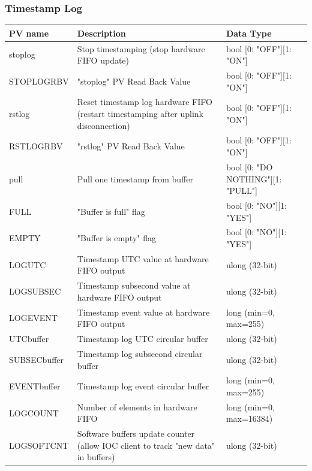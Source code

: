 \documentclass[openany]{article}
\begin{document}
		\subsubsection{Timestamp Log}\label{pvgroup:evre-timestamp-log}
			\begin{center}
			\begin{tabular}{| m{2.8cm} m{6cm} m{6cm} |}
			    \hline
			    \bfseries PV name & \bfseries Description & \bfseries Data Type \\ \hline
			    stoplog & Stop timestamping (stop hardware FIFO update) & bool [0: "OFF"][1: "ON"] \\ \hline
			    STOPLOGRBV & "stoplog" PV Read Back Value & bool [0: "OFF"][1: "ON"] \\ \hline
			    rstlog & Reset timestamp log hardware FIFO (restart timestamping after uplink disconnection) & bool [0: "OFF"][1: "ON"] \\ \hline
			    RSTLOGRBV & "rstlog" PV Read Back Value & bool [0: "OFF"][1: "ON"] \\ \hline
			    pull & Pull one timestamp from buffer & bool [0: "DO NOTHING"][1: "PULL"] \\ \hline
			    FULL & "Buffer is full" flag & bool [0: "NO"][1: "YES"] \\ \hline
			    EMPTY & "Buffer is empty" flag & bool [0: "NO"][1: "YES"] \\ \hline
			    LOGUTC & Timestamp UTC value at hardware FIFO output & ulong (32-bit) \\ \hline
			    LOGSUBSEC & Timestamp subsecond value at hardware FIFO output & ulong (32-bit) \\ \hline
			    LOGEVENT & Timestamp event value at hardware FIFO output & long (min=0, max=255) \\ \hline
			    UTCbuffer & Timestamp log UTC circular buffer & ulong (32-bit) \\ \hline
			    SUBSECbuffer & Timestamp log subsecond circular buffer & ulong (32-bit) \\ \hline
			    EVENTbuffer & Timestamp log event circular buffer & long (min=0, max=255) \\ \hline
			    LOGCOUNT & Number of elements in hardware FIFO & long (min=0, max=16384) \\ \hline
			    LOGSOFTCNT & Software buffers update counter (allow IOC client to track "new data" in buffers) & ulong (32-bit) \\ \hline
			\end{tabular}
			\end{center}
\end{document}
